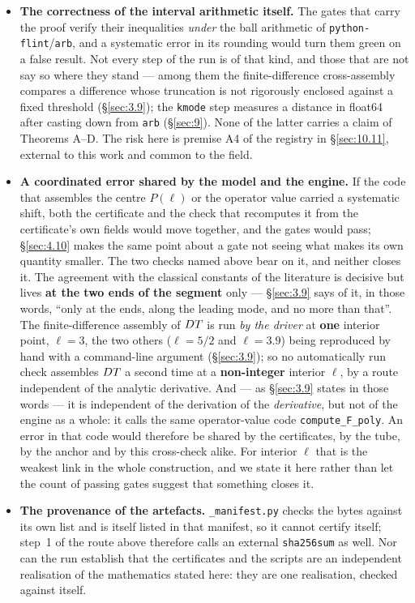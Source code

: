 \begin{itemize}
\item \textbf{The correctness of the interval arithmetic itself.} The gates
  that carry the proof verify their inequalities \emph{under} the ball
  arithmetic of \texttt{python-flint}/\texttt{arb}, and a systematic error in
  its rounding would turn them green on a false result. Not every step of the
  run is of that kind, and those that are not say so where they stand ---
  among them the
  finite-difference cross-assembly compares
  a difference whose truncation is not rigorously enclosed against a fixed
  threshold (\S\ref{sec:3.9}); the \texttt{kmode} step measures a distance in
  float64 after casting down from \texttt{arb} (\S\ref{sec:9}). None of the
  latter carries a claim of Theorems A--D. The risk here is premise A4 of the
  registry in \S\ref{sec:10.11}, external to this work and common to the field.
\item \textbf{A coordinated error shared by the model and the engine.} If the
  code that assembles the centre $P(\ell)$ or the operator value carried a
  systematic shift, both the certificate and the check that recomputes it from
  the certificate's own fields would move together, and the gates would pass;
  \S\ref{sec:4.10} makes the same point about a gate not seeing what makes its
  own quantity smaller. The two checks named above bear on it, and neither
  closes it. The agreement with the classical constants of the literature is
  decisive but lives \textbf{at the two ends of the segment} only ---
  \S\ref{sec:3.9} says of it, in those words, ``only at the ends, along the
  leading mode, and no more than that''. The
  finite-difference assembly of $DT$ is run \emph{by the driver} at
  \textbf{one} interior point, $\ell = 3$, the two others ($\ell = 5/2$ and
  $\ell = 3.9$) being reproduced by hand with a command-line argument
  (\S\ref{sec:3.9}); so no automatically run check assembles $DT$ a second
  time at a \textbf{non-integer} interior $\ell$, by a route independent of
  the analytic derivative. And --- as \S\ref{sec:3.9} states in
  those words --- it is independent of the derivation of the \emph{derivative},
  but not of the engine as a whole: it calls the same operator-value code
  \texttt{compute\_\allowbreak F\_\allowbreak poly}. An error in that code
  would therefore be shared by the certificates, by the tube, by the anchor and
  by this cross-check alike. For interior $\ell$ that is the weakest link in
  the whole construction, and we state it here rather than let the count of
  passing gates suggest that something closes it.
\item \textbf{The provenance of the artefacts.} \texttt{\_manifest.py} checks
  the bytes against its own list and is itself listed in that manifest, so it
  cannot certify itself; step~1 of the route above therefore calls an external
  \texttt{sha256sum} as well. Nor can the run establish that the certificates
  and the scripts are an independent realisation of the mathematics stated
  here: they are one realisation, checked against itself.
\end{itemize}

